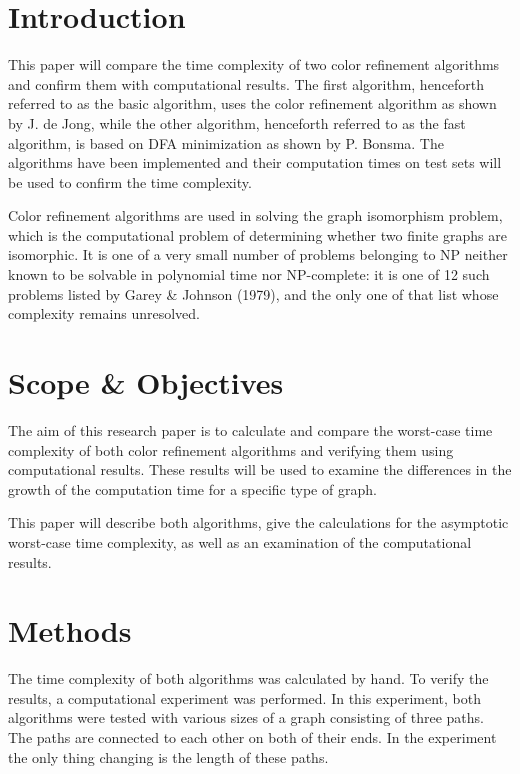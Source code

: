\documentclass[twoside]{article}
\begin{document}
\begin{multicols}{2} %



\section{Introduction}
\label{intro}
This paper will compare the time complexity of two color refinement algorithms and confirm them with computational results. The first algorithm, henceforth referred to as the basic algorithm, uses the color refinement algorithm as shown by J. de Jong\cite{presentation:slidesPartI}, while the other algorithm, henceforth referred to as the fast algorithm, is based on DFA minimization as shown by P. Bonsma\cite{presentation:slidesPartIII}. The algorithms have been implemented and their computation times on test sets will be used to confirm the time complexity.

Color refinement algorithms are used in solving the graph isomorphism problem, which is the computational problem of determining whether two finite graphs are isomorphic. It is one of a very small number of problems belonging to NP neither known to be solvable in polynomial time nor NP-complete: it is one of 12 such problems listed by Garey \& Johnson (1979)\cite{book:gareyJohnson1979}, and the only one of that list whose complexity remains unresolved.\cite{website:wikiGI}

\section{Scope \& Objectives}
\label{scope}
The aim of this research paper is to calculate and compare the worst-case time complexity of both color refinement algorithms and verifying them using computational results. These results will be used to examine the differences in the growth of the computation time for a specific type of graph.

This paper will describe both algorithms, give the calculations for the asymptotic worst-case time complexity, as well as an examination of the computational results.
\section{Methods}
\label{methods}
The time complexity of both algorithms was calculated by hand. To verify the results, a computational experiment was performed. In this experiment, both algorithms were tested with various sizes of a graph consisting of three paths. The paths are connected to each other on both of their ends. In the experiment the only thing changing is the length of these paths.


\end{multicols}
\end{document}

